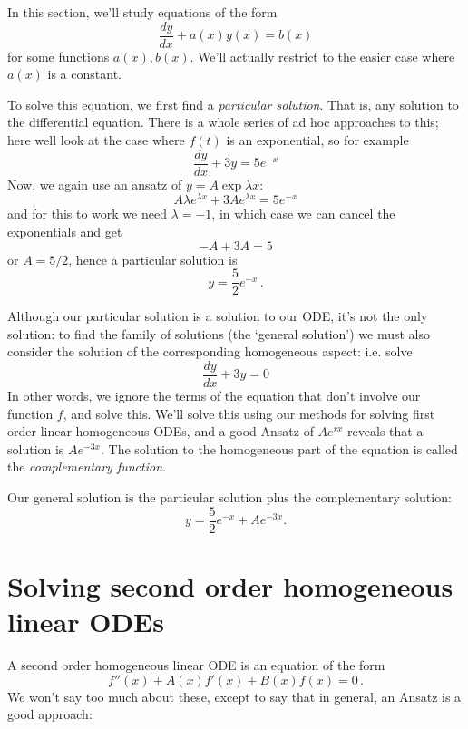 \documentclass[12pt]{article}
\begin{document}
In this section, we'll study equations of the form 
\[
\frac{dy}{dx} + a(x)y(x) = b(x)
\]
for some functions $a(x),b(x)$. We'll actually restrict to the easier case where $a(x)$ is a constant.

To solve this equation, we first find a \emph{particular solution}. That is, any solution to the differential equation. 
There
is a whole series of ad hoc approaches to this; here well look at the case where $f(t)$ is an exponential, so for example
\begin{equation}
  \frac{dy}{dx} + 3y=5e^{-x}
\end{equation}
Now, we again use an ansatz of $y=A\exp{\lambda x}$:
\begin{equation}
  A\lambda e^{\lambda x}+3Ae^{\lambda x}=5e^{- x}
\end{equation}
and for this to work we need $\lambda=-1$, in which case we can cancel the exponentials and get
\begin{equation}
  -A+3A=5
\end{equation}
or $A=5/2$, hence a particular solution is
\begin{equation}
  y=\frac{5}{2}e^{-x}\,.
\end{equation}

Although our particular solution is a solution to our ODE, it's not the only solution: to find the family of solutions (the `general solution') we must also consider the solution of the corresponding homogeneous aspect: i.e. solve 
\[
\frac{dy}{dx} + 3y= 0
\]
In other words, we ignore the terms of the equation that don't involve our function $f$, and solve this. We'll solve this using our methods for solving first order linear homogeneous ODEs, and a good Ansatz of $Ae^{rx}$ reveals that a solution is $Ae^{-3x}$. The solution to the homogeneous part of the equation is called the \emph{complementary function}.

Our general solution is the particular solution plus the complementary solution: 
\[
y=\frac{5}{2}e^{-x} + Ae^{-3x}.
\]

\section*{Solving second order homogeneous linear ODEs}
A second order homogeneous linear ODE is an equation of the form
\[
f''(x) + A(x) f'(x) + B(x)f(x) = 0\,.
\]
We won't say too much about these, except to say that in general, an Ansatz is a good approach:
\end{document}
